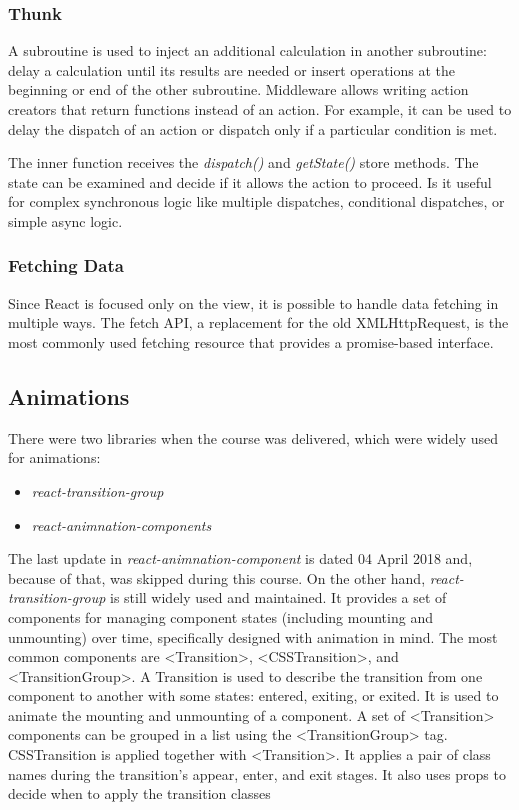 \subsubsection*{Thunk}
A subroutine is used to inject an additional calculation in another subroutine: delay a calculation until its results are needed or insert operations at the beginning or end of the other subroutine.
Middleware allows writing action creators that return functions instead of an action. For example, it can be used to delay the dispatch of an action or dispatch only if a particular condition is met.

The inner function receives the \textit{dispatch()} and \textit{getState()} store methods. The state can be examined and decide if it allows the action to proceed. Is it useful for complex synchronous logic like multiple dispatches, conditional dispatches, or simple async logic.

\subsubsection*{Fetching Data}
Since React is focused only on the view, it is possible to handle data fetching in multiple ways. The fetch API, a replacement for the old XMLHttpRequest, is the most commonly used fetching resource that provides a promise-based interface.

\subsection*{Animations}
There were two libraries when the course was delivered, which were widely used for animations:
\begin{itemize}
    \item \textit{react-transition-group}
    \item \textit{react-animnation-components}
\end{itemize} 
The last update in \textit{react-animnation-component} is dated 04 April 2018 and, because of that, was skipped during this course.
On the other hand, \textit{react-transition-group} is still widely used and maintained. It provides a set of components for managing component states (including mounting and unmounting) over time, specifically designed with animation in mind. The most common components are <Transition>, <CSSTransition>, and <TransitionGroup>.
A Transition is used to describe the transition from one component to another with some states: entered, exiting, or exited. It is used to animate the mounting and unmounting of a component. A set of <Transition> components can be grouped in a list using the <TransitionGroup> tag.
CSSTransition is applied together with <Transition>. It applies a pair of class names during the transition's appear, enter, and exit stages. It also uses props to decide when to apply the transition classes

